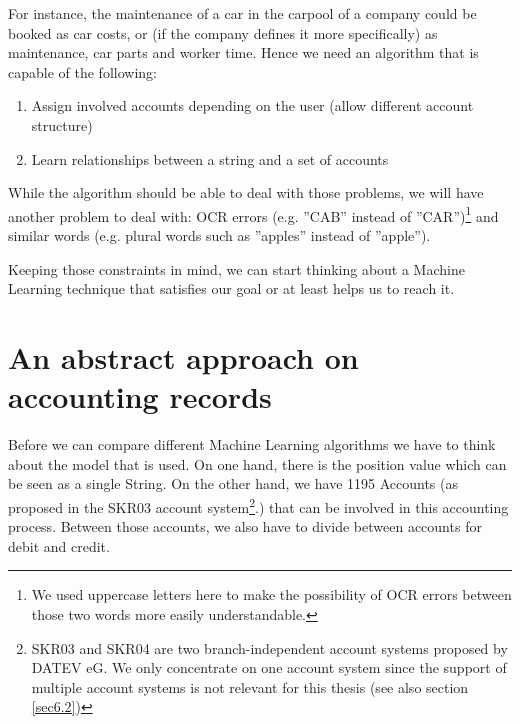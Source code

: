 For instance, the maintenance of a car in the carpool of a company could be booked as car costs, or (if the company defines it more specifically) as maintenance, car parts and worker time.
Hence we need an algorithm that is capable of the following:
\begin{enumerate}
		\item Assign involved accounts depending on the user (allow different account structure)
		\item Learn relationships between a string and a set of accounts
\end{enumerate}
While the algorithm should be able to deal with those problems, we will have another problem to deal with: OCR errors (e.g. ''CAB'' instead of ''CAR'')\footnote{We used uppercase letters here to make the possibility of OCR errors between those two words more easily understandable.}  and similar words (e.g. plural words such as ''apples'' instead of ''apple''). 

Keeping those constraints in mind, we can start thinking about a Machine Learning technique that satisfies our goal or at least helps us to reach it.


\section{An abstract approach on accounting records}
\label{sec4.1}

Before we can compare different Machine Learning algorithms we have to think about the model that is used. On one hand, there is the position value which can be seen as a single String. On the other hand, we have 1195 Accounts (as proposed in the SKR03 account system\cite{datev12}\footnote{SKR03 and SKR04 are two branch-independent account systems proposed by DATEV eG. We only concentrate on one account system since the support of multiple account systems is not relevant for this thesis (see also section \ref{sec6.2})}.) that can be involved in this accounting process. Between those accounts, we also have to divide between accounts for debit and credit.

